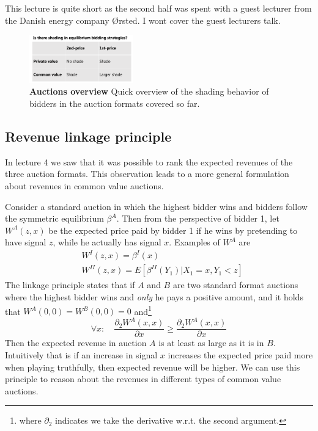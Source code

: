 This lecture is quite short as the second half was spent with a guest lecturer from the Danish energy company Ørsted. I wont cover the guest lecturers talk.

\begin{figure}
\includegraphics[width=0.4\textwidth]{figures/shadetable.png}    
\caption{\textbf{Auctions overview} Quick overview of the shading behavior of bidders in the auction formats covered so far.}
\end{figure}

\subsection{Revenue linkage principle}
In lecture 4 we saw that it was possible to rank the expected revenues of the three auction formats. This observation leads to a more general formulation about revenues in common value auctions. 

Consider a standard auction in which the highest bidder wins and bidders follow the symmetric equilibrium $\beta^A$. Then from the perspective of bidder 1, let $W^A(z,x)$ be the expected price paid by bidder 1 if he wins by pretending to have signal $z$, while he actually has signal $x$. Examples of $W^A$ are 
\begin{align}
 &   W^I(z,x) = \beta^I(x) \\ 
 &  W^{II}(z,x) = E[\beta^{II}(Y_1)|X_1 = x, Y_1 < z]
\end{align}
The linkage principle states that if $A$ and $B$ are two standard format auctions where the highest bidder wins and \textit{only} he pays a positive amount, and it holds that $W^A(0,0)=W^B(0,0)=0$ and\footnote{where $\partial_2$ indicates we take the derivative w.r.t. the second argument.}
\begin{equation}
    \forall x: \quad \frac{\partial_2 W^A(x,x)}{\partial x} \geq \frac{\partial_2 W^A(x,x)}{\partial x}
\end{equation}
Then the expected revenue in auction $A$ is at least as large as it is in $B$. Intuitively that is if an increase in signal $x$ increases the expected price paid more when playing truthfully, then expected revenue will be higher. We can use this principle to reason about the revenues in different types of common value auctions.  